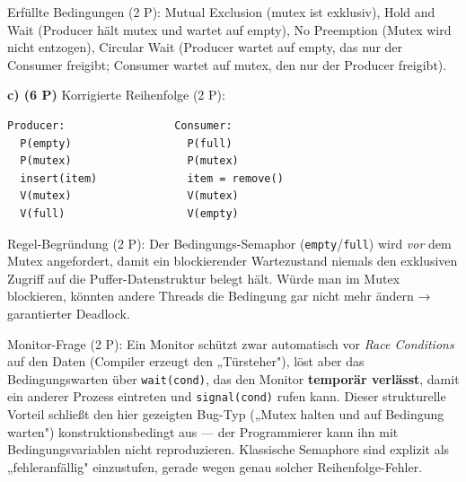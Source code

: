 \documentclass[11pt, a4paper]{article}
\begin{document}
Erfüllte Bedingungen (2 P): Mutual Exclusion (mutex ist exklusiv), Hold and Wait (Producer hält mutex und wartet auf empty), No Preemption (Mutex wird nicht entzogen), Circular Wait (Producer wartet auf empty, das nur der Consumer freigibt; Consumer wartet auf mutex, den nur der Producer freigibt).


\textbf{c) (6 P)} Korrigierte Reihenfolge (2 P):

\begin{lstlisting}
Producer:                 Consumer:
  P(empty)                  P(full)
  P(mutex)                  P(mutex)
  insert(item)              item = remove()
  V(mutex)                  V(mutex)
  V(full)                   V(empty)
\end{lstlisting}

Regel-Begründung (2 P): Der Bedingungs-Semaphor (\texttt{empty}/\texttt{full}) wird \textit{vor} dem Mutex angefordert, damit ein blockierender Wartezustand niemals den exklusiven Zugriff auf die Puffer-Datenstruktur belegt hält. Würde man im Mutex blockieren, könnten andere Threads die Bedingung gar nicht mehr ändern → garantierter Deadlock.


Monitor-Frage (2 P): Ein Monitor schützt zwar automatisch vor \textit{Race Conditions} auf den Daten (Compiler erzeugt den „Türsteher"), löst aber das Bedingungswarten über \texttt{wait(cond)}, das den Monitor \textbf{temporär verlässt}, damit ein anderer Prozess eintreten und \texttt{signal(cond)} rufen kann. Dieser strukturelle Vorteil schließt den hier gezeigten Bug-Typ („Mutex halten und auf Bedingung warten") konstruktionsbedingt aus — der Programmierer kann ihn mit Bedingungsvariablen nicht reproduzieren. Klassische Semaphore sind explizit als „fehleranfällig" einzustufen, gerade wegen genau solcher Reihenfolge-Fehler.





\end{document}
